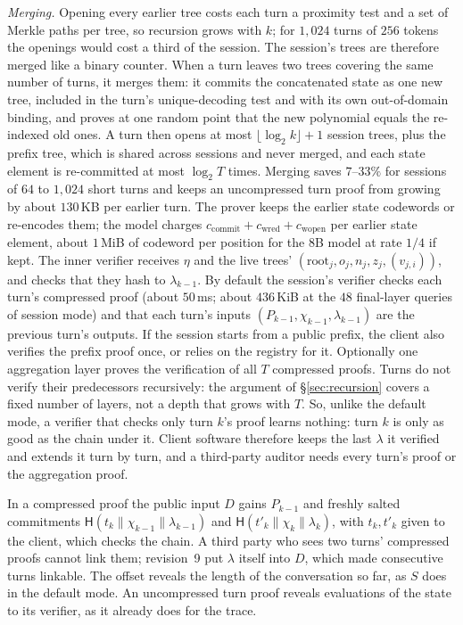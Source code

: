 \documentclass[11pt]{article}
\begin{document}
\emph{Merging.} Opening every earlier tree costs each turn a proximity test and a set of Merkle paths per tree, so recursion grows with \(k\); for \(1{,}024\) turns of \(256\) tokens the openings would cost a third of the session.
The session's trees are therefore merged like a binary counter. When a turn leaves two trees covering the same number of turns, it merges them: it commits the concatenated state as one new tree, included in the turn's unique-decoding test and with its own out-of-domain binding, and proves at one random point that the new polynomial equals the re-indexed old ones.
A turn then opens at most \(\lfloor\log_2 k\rfloor + 1\) session trees, plus the prefix tree, which is shared across sessions and never merged, and each state element is re-committed at most \(\log_2 T\) times.
Merging saves \(7\)--\(33\%\) for sessions of \(64\) to \(1{,}024\) short turns and keeps an uncompressed turn proof from growing by about \(130\)\,KB per earlier turn.
The prover keeps the earlier state codewords or re-encodes them; the model charges \(c_{\mathrm{commit}} + c_{\mathrm{wred}} + c_{\mathrm{wopen}}\) per earlier state element, about \(1\)\,MiB of codeword per position for the 8B model at rate \(1/4\) if kept.
The inner verifier receives \(\eta\) and the live trees' \((\mathrm{root}_j, o_j, n_j, z_j, (v_{j,i}))\), and checks that they hash to \(\lambda_{k-1}\).
By default the session's verifier checks each turn's compressed proof (about \(50\)\,ms; about \(436\)\,KiB at the \(48\) final-layer queries of session mode) and that each turn's inputs \((P_{k-1}, \chi_{k-1}, \lambda_{k-1})\) are the previous turn's outputs.
If the session starts from a public prefix, the client also verifies the prefix proof once, or relies on the registry for it.
Optionally one aggregation layer proves the verification of all \(T\) compressed proofs.
Turns do not verify their predecessors recursively: the argument of \S\ref{sec:recursion} covers a fixed number of layers, not a depth that grows with \(T\).
So, unlike the default mode, a verifier that checks only turn \(k\)'s proof learns nothing: turn \(k\) is only as good as the chain under it.
Client software therefore keeps the last \(\lambda\) it verified and extends it turn by turn, and a third-party auditor needs every turn's proof or the aggregation proof.

In a compressed proof the public input \(D\) gains \(P_{k-1}\) and freshly salted commitments \(\mathsf{H}(t_k \| \chi_{k-1} \| \lambda_{k-1})\) and \(\mathsf{H}(t'_k \| \chi_k \| \lambda_k)\), with \(t_k, t'_k\) given to the client, which checks the chain.
A third party who sees two turns' compressed proofs cannot link them; revision~9 put \(\lambda\) itself into \(D\), which made consecutive turns linkable.
The offset reveals the length of the conversation so far, as \(S\) does in the default mode.
An uncompressed turn proof reveals evaluations of the state to its verifier, as it already does for the trace.
\end{document}
